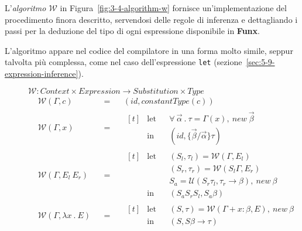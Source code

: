 \noindent L'\textit{algoritmo $\mathcal{W}$} \cite{Lee-1998-FolkloreInference}
in Figura~\ref{fig:3-4-algorithm-w} fornisce un'implementazione del procedimento finora descritto,
servendosi delle regole di inferenza e dettagliando i passi per la deduzione del tipo di ogni espressione disponibile in \textbf{Funx}.

\noindent L'algoritmo appare nel codice del compilatore in una forma molto simile, seppur talvolta più complessa,
come nel caso dell'espressione \texttt{let} (sezione~\ref{sec:5-9-expression-inference}).

\newpage

\begin{figure}
    $\mathcal{W} : Context \times Expression \rightarrow Substitution \times Type$
    \newcommand{\algW}[2]{\mathcal{W}(#1, #2)}
    \newcommand{\algWline}[2]{& \algW{#1}{#2} & & = & &}
    \[
        \begin{aligned}
            \algWline{\Gamma}{c} (id, constantType(c))
            \\
            \algWline{\Gamma}{x}
            \begin{aligned}[t]
                 & \text{let} &  & \forall\ \vec{\alpha}\ .\ \tau = \Gamma(x),\ new\ \vec{\beta} \\
                 & \text{in}  &  & (id, \{\vec{\beta} / \vec{\alpha}\} \tau)
            \end{aligned}
            \\
            \algWline{\Gamma}{E_l\ E_r}
            \begin{aligned}[t]
                 & \text{let} &  & (S_l, \tau_l) = \algW{\Gamma}{E_l}                                   \\
                 &            &  & (S_r, \tau_r) = \algW{S_l\Gamma}{E_r}                                \\
                 &            &  & S_a = \mathcal{U}(S_r \tau_l, \tau_r \rightarrow \beta),\ new\ \beta \\
                 & \text{in}  &  & (S_a S_r S_l, S_a \beta)
            \end{aligned}
            \\
            \algWline{\Gamma}{\lambda x\ .\ E}
            \begin{aligned}[t]
                 & \text{let} &  & (S, \tau) = \algW{\Gamma + x : \beta}{E},\ new\ \beta \\
                 & \text{in}  &  & (S, S \beta \rightarrow \tau)
            \end{aligned}

\end{aligned}\]
\end{figure}
